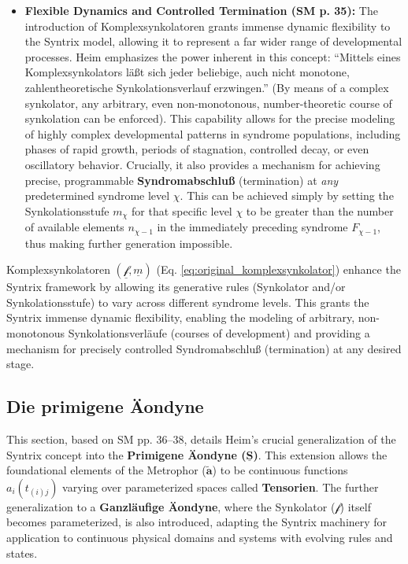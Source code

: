 \documentclass[12pt]{article}
\newcommand{\q}[1]{\enquote{#1}}
\newcommand{\metrophor}{\bm{\widetilde{a}}}
\newcommand{\synkolator}{\mathcal{f}}
\newcommand{\synkolationsstufe}{m}
\newcommand{\syndrom}{F}
\begin{document}
\begin{itemize}
    \item \textbf{Flexible Dynamics and Controlled Termination (SM p. 35):}
    The introduction of Komplexsynkolatoren grants immense dynamic flexibility to the Syntrix model, allowing it to represent a far wider range of developmental processes. Heim emphasizes the power inherent in this concept: \q{Mittels eines Komplexsynkolators läßt sich jeder beliebige, auch nicht monotone, zahlentheoretische Synkolationsverlauf erzwingen.} (By means of a complex synkolator, any arbitrary, even non-monotonous, number-theoretic course of synkolation can be enforced). This capability allows for the precise modeling of highly complex developmental patterns in syndrome populations, including phases of rapid growth, periods of stagnation, controlled decay, or even oscillatory behavior. Crucially, it also provides a mechanism for achieving precise, programmable \textbf{Syndromabschluß} (termination) at \textit{any} predetermined syndrome level \( \chi \). This can be achieved simply by setting the Synkolationsstufe \( \synkolationsstufe_\chi \) for that specific level \( \chi \) to be greater than the number of available elements \( n_{\chi-1} \) in the immediately preceding syndrome \( \syndrom_{\chi-1} \), thus making further generation impossible.
\end{itemize}

Komplexsynkolatoren \( (\underline{\synkolator}, \underline{\synkolationsstufe}) \) (Eq. \eqref{eq:original_komplexsynkolator}) enhance the Syntrix framework by allowing its generative rules (Synkolator and/or Synkolationsstufe) to vary across different syndrome levels. This grants the Syntrix immense dynamic flexibility, enabling the modeling of arbitrary, non-monotonous Synkolationsverläufe (courses of development) and providing a mechanism for precisely controlled Syndromabschluß (termination) at any desired stage.

\subsection{Die primigene Äondyne}
\label{sec:aeondyne}

This section, based on SM pp. 36--38, details Heim's crucial generalization of the Syntrix concept into the \textbf{Primigene \"{A}ondyne (\(\underline{\bm{S}}\))}. This extension allows the foundational elements of the Metrophor (\(\metrophor\)) to be continuous functions \(a_i(t_{(i)j})\) varying over parameterized spaces called \textbf{Tensorien}. The further generalization to a \textbf{Ganzläufige \"{A}ondyne}, where the Synkolator (\(\synkolator\)) itself becomes parameterized, is also introduced, adapting the Syntrix machinery for application to continuous physical domains and systems with evolving rules and states.
\end{document}
